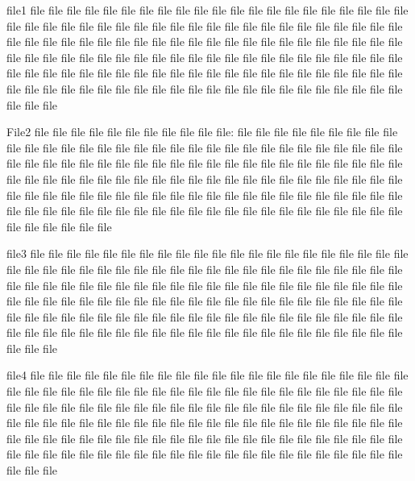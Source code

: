 


 
file1 file file file file file file file file file file file file file file file file file file file file file file file file file file file file file file file file file file file file file file file file file file file file file file file file file file file file file file file file file file file file file file file file file file file file file file file file file file file file file file file file file file file file file file file file file file file file file file file file file file file file file file file file file file file file file file file file file file file file file file file file file file file file file file file file file file file file file file

File2 file file
file file
file file file file file file file:
file file file file file file file file file
file file file file file file file file file file file file file file file file file file file file file file file file file file file file file file file file file file file file file file file file file file file file file file file file file file file file file file file file file file file file file file file file file file file file file file file file file file file file file file file file file file file file file file file file file file file file file file file file file file file file file file file file file file file file file file file file file file file file

 
file3 file file file file file file file file file file file file file file file file file file file file file file file file file file file file file file file file file file file file file file file file file file file file file file file file file file file file file file file file file file file file file file file file file file file file file file file file file file file file file file file file file file file file file file file file file file file file file file file file file file file file file file file file file file file file file file file file file file file file file file file file file file file file file file file file file file file file file file

 
file4 file file file file file file file file file file file file file file file file file file file file file file file file file file file file file file file file file file file file file file file file file file file file file file file file file file file file file file file file file file file file file file file file file file file file file file file file file file file file file file file file file file file file file file file file file file file file file file file file file file file file file file file file file file file file file file file file file file file file file file file file file file file file file file file file file file file file file file

